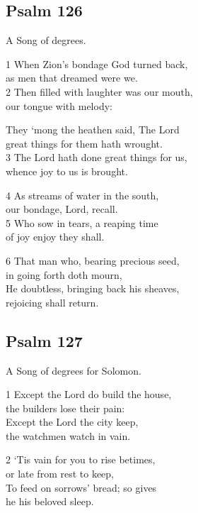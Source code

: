 \subsection*{Psalm 126}

A Song of degrees.

1 When Zion’s bondage God turned back,\\
as men that dreamed were we.\\
2 Then filled with laughter was our mouth,\\
our tongue with melody:

They ‘mong the heathen said, The Lord\\
great things for them hath wrought.\\
3 The Lord hath done great things for us,\\
whence joy to us is brought.

4 As streams of water in the south,\\
our bondage, Lord, recall.\\
5 Who sow in tears, a reaping time\\
of joy enjoy they shall.

6 That man who, bearing precious seed,\\
in going forth doth mourn,\\
He doubtless, bringing back his sheaves,\\
rejoicing shall return.

\begin{center}
\quad{}\quad{}
\end{center}

\subsection*{Psalm 127}

A Song of degrees for Solomon.

1 Except the Lord do build the house,\\
the builders lose their pain:\\
Except the Lord the city keep,\\
the watchmen watch in vain.

2 ‘Tis vain for you to rise betimes,\\
or late from rest to keep,\\
To feed on sorrows’ bread; so gives\\
he his beloved sleep.

